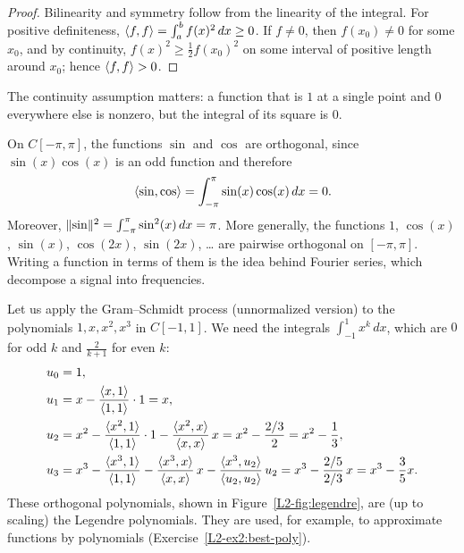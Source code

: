 \begin{proof}
    Bilinearity and symmetry follow from the linearity of the integral. For positive definiteness, $\langle f, f \rangle = \int_a^b f(x)^2 \, dx \geq 0$. If $f \neq 0$, then $f(x_0) \neq 0$ for some $x_0$, and by continuity, $f(x)^2 \geq \frac{1}{2} f(x_0)^2$ on some interval of positive length around $x_0$; hence $\langle f, f \rangle > 0$.
\end{proof}

The continuity assumption matters: a function that is $1$ at a single point and $0$ everywhere else is nonzero, but the integral of its square is $0$.

\begin{example}
    On $C[-\pi, \pi]$, the functions $\sin$ and $\cos$ are orthogonal, since $\sin(x)\cos(x)$ is an odd function and therefore
    \[\langle \sin, \cos \rangle = \int_{-\pi}^{\pi} \sin(x) \cos(x) \, dx = 0.\]
    Moreover, $\lVert \sin \rVert^2 = \int_{-\pi}^{\pi} \sin^2(x) \, dx = \pi$. More generally, the functions $1$, $\cos(x)$, $\sin(x)$, $\cos(2x)$, $\sin(2x)$, \ldots{} are pairwise orthogonal on $[-\pi, \pi]$. Writing a function in terms of them is the idea behind Fourier series, which decompose a signal into frequencies.
\end{example}

\begin{example}\label{L2-ex:legendre}
    Let us apply the Gram--Schmidt process (unnormalized version) to the polynomials $1, x, x^2, x^3$ in $C[-1, 1]$. We need the integrals $\int_{-1}^1 x^k \, dx$, which are $0$ for odd $k$ and $\frac{2}{k + 1}$ for even $k$:
    \begin{align*}
        u_0 &= 1, \\
        u_1 &= x - \frac{\langle x, 1 \rangle}{\langle 1, 1 \rangle} \cdot 1 = x, \\
        u_2 &= x^2 - \frac{\langle x^2, 1 \rangle}{\langle 1, 1 \rangle} \cdot 1 - \frac{\langle x^2, x \rangle}{\langle x, x \rangle} \, x = x^2 - \frac{2/3}{2} = x^2 - \frac{1}{3}, \\
        u_3 &= x^3 - \frac{\langle x^3, 1 \rangle}{\langle 1, 1 \rangle} - \frac{\langle x^3, x \rangle}{\langle x, x \rangle} \, x - \frac{\langle x^3, u_2 \rangle}{\langle u_2, u_2 \rangle} \, u_2 = x^3 - \frac{2/5}{2/3} \, x = x^3 - \frac{3}{5} x.
    \end{align*}
    These orthogonal polynomials, shown in Figure~\ref{L2-fig:legendre}, are (up to scaling) the Legendre polynomials. They are used, for example, to approximate functions by polynomials (Exercise~\ref{L2-ex2:best-poly}).
\end{example}

